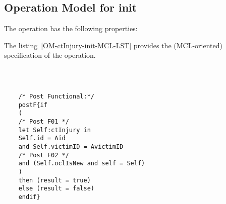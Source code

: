 \subsection{Operation Model for init}

\label{OM-init}


The  operation has the following properties:

	\begin{operationmodel}



		


	\end{operationmodel}



	\vspace{1cm}
	The listing~\ref{OM-ctInjury-init-MCL-LST} provides the \msrmessir (MCL-oriented) specification of the operation.
	
	\scriptsize
	\vspace{0.5cm}
	\begin{lstlisting}[style=MessirStyle,firstnumber=auto,captionpos=b,caption={\msrmessir (MCL-oriented) specification of the operation \emph{init}.},label=OM-ctInjury-init-MCL-LST]

	
	
	/* Post Functional:*/ 
	postF{if
	(
	/* Post F01 */
	let Self:ctInjury in
	Self.id = Aid
	and Self.victimID = AvictimID
	/* Post F02 */
	and (Self.oclIsNew and self = Self)
	)
	then (result = true)
	else (result = false)
	endif}
	
	
	\end{lstlisting}
	\normalsize 
	
	
	
	





